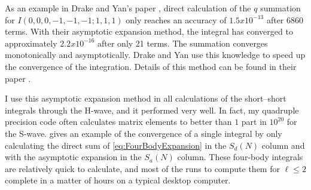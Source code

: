 \documentclass[Dissertation.tex]{subfiles}
\begin{document}
As an example in Drake and Yan's paper \cite{Drake1995}, direct calculation of the $q$ summation for $I(0,0,0,-1,-1,-1; 1,1,1)$ only reaches an accuracy of $1.5 x 10^{-13}$ after 6860 terms. With their asymptotic expansion method, the integral has converged to approximately $2.2 x 10^{-16}$ after only 21 terms. The summation converges monotonically and asymptotically. Drake and Yan use this knowledge to speed up the convergence of the integration. Details of this method can be found in their paper \cite{Drake1995}.

I use this asymptotic expansion method in all calculations of the short--short integrals through the H-wave, and it performed very well. In fact, my quadruple precision code often calculates matrix elements to better than $1$ part in $10^{20}$ for the S-wave.  gives an example of the convergence of a single integral by only calculating the direct sum of \cref{eq:FourBodyExpansion} in the $S_d(N)$ column and with the asymptotic expansion in the $S_a(N)$ column. These four-body integrals are relatively quick to calculate, and most of the runs to compute them for $\ell \leq 2$ complete in a matter of hours on a typical desktop computer.
\end{document}
